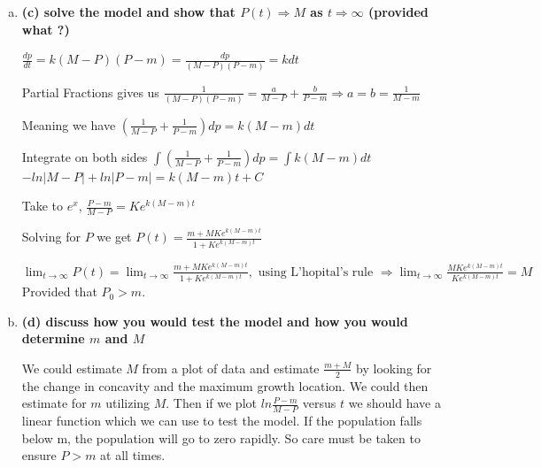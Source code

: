 \documentclass{article}
\begin{document}
\begin{enumerate}[1.]
\begin{enumerate}[(a)]
\item \textbf{(c) solve the model and show that $P(t) \Rightarrow M$ as $t \Rightarrow \infty$ (provided what ?)}

$\frac{dp}{dt} = k(M - P)(P - m) = \frac{dp}{(M - P)(P - m)} = kdt$

Partial Fractions gives us $\frac{1}{(M-P)(P-m)} = \frac{a}{M-P} + \frac{b}{P - m} \Rightarrow a = b = \frac{1}{M - m}$

Meaning we have $(\frac{1}{M-P} + \frac{1}{P - m})dp = k(M - m)dt$

Integrate on both sides $\int(\frac{1}{M - P} + \frac{1}{P - m})dp = \int{k(M - m)dt}$\\
$-ln|M - P| + ln|P - m| = k(M - m)t + C$

Take to $e^x$, $\frac{P - m}{M - P} = Ke^{k(M - m)t}$

Solving for $P$ we get $P(t) = \frac{m + MKe^{k(M-m)t}}{1 + Ke^{k(M-m)t}}$

$\lim_{t \to \infty} P(t) = \lim_{t \to \infty} \frac{m + MKe^{k(M-m)t}}{1 + Ke^{k(M-m)t}}, \text{ using L'hopital's rule } \Rightarrow \lim_{t \to \infty} \frac{MKe^{k(M-m)t}}{Ke^{k(M-m)t}} = M$ Provided that $P_0 > m$. 

\item \textbf{(d) discuss how you would test the model and how you would determine $m$ and $M$}

We could estimate $M$ from a plot of data and estimate $\frac{m + M}{2}$ by looking for the change in concavity and the maximum growth location. We could then estimate for $m$ utilizing $M$. Then if we plot $ln\frac{P - m}{M - P}$ versus $t$ we should have a linear function which we can use to test the model. If the population falls below m, the population will go to zero rapidly. So care must be taken to ensure $P > m$ at all times. 

\end{enumerate}

\end{enumerate}
\end{document}
